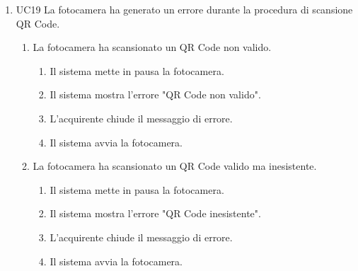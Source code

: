 \documentclass[a4paper, 12pt]{article}
\begin{document}
\begin{enumerate}
    \item UC19 La fotocamera ha generato un errore durante la procedura di scansione QR Code.
    \begin{enumerate}
        \item La fotocamera ha scansionato un QR Code non valido.
        \begin{enumerate}
            \item Il sistema mette in pausa la fotocamera.
            \item Il sistema mostra l'errore "QR Code non valido".
            \item L'acquirente chiude il messaggio di errore.
            \item Il sistema avvia la fotocamera.
        \end{enumerate}
        \item La fotocamera ha scansionato un QR Code valido ma inesistente.
        \begin{enumerate}
            \item Il sistema mette in pausa la fotocamera.
            \item Il sistema mostra l'errore "QR Code inesistente".
            \item L'acquirente chiude il messaggio di errore.
            \item Il sistema avvia la fotocamera.
        \end{enumerate}
    \end{enumerate}
\end{enumerate}
\end{document}
